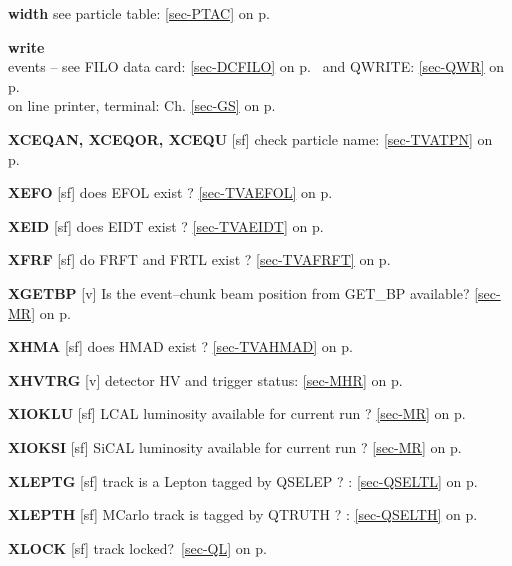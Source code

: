  
 \item{\bf width   }see particle table: \ref{sec-PTAC} on p.~\pageref{sec-PTAC}\\
 \item{\bf write}\\
 \subitem events -- see FILO data card: \ref{sec-DCFILO} on p.~\pageref{sec-DCFILO}
 and QWRITE:
 \ref{sec-QWR} on p.~\pageref{sec-QWR}\\
 \subitem on line printer, terminal: Ch. \ref{sec-GS} on p.~\pageref{sec-GS}
 
 
 \item{\bf XCEQAN, XCEQOR, XCEQU  }[sf] check particle name:
 \ref{sec-TVATPN} on p.~\pageref{sec-TVATPN}\\
 \item{\bf XEFO    }[sf] does EFOL exist ? \ref{sec-TVAEFOL} on p.~\pageref{sec-TVAEFOL}\\
 \item{\bf XEID    }[sf] does EIDT exist ? \ref{sec-TVAEIDT} on p.~\pageref{sec-TVAEIDT}\\
 \item{\bf XFRF    }[sf] do FRFT and FRTL exist ? \ref{sec-TVAFRFT} on p.~\pageref{sec-TVAFRFT}\\
 \item{\bf XGETBP  }[v] Is the event--chunk beam position from GET\_BP available?
 \ref{sec-MR} on p.~\pageref{sec-MR}\\
 \item{\bf XHMA    }[sf] does HMAD exist ? \ref{sec-TVAHMAD} on p.~\pageref{sec-TVAHMAD}\\
 \item{\bf XHVTRG  }[v]  detector HV and trigger status: \ref{sec-MHR} on p.~\pageref{sec-MHR}\\
 \item{\bf XIOKLU  }[sf] LCAL  luminosity available for current run ? \ref{sec-MR} on p.~\pageref{sec-MR}\\
 \item{\bf XIOKSI  }[sf] SiCAL luminosity available for current run ? \ref{sec-MR} on p.~\pageref{sec-MR}\\
 \item{\bf XLEPTG  }[sf] track is a Lepton tagged by QSELEP ? : \ref{sec-QSELTL} on p.~\pageref{sec-QSELTL}\\
 \item{\bf XLEPTH  }[sf] MCarlo track is tagged by QTRUTH ? : \ref{sec-QSELTH} on p.~\pageref{sec-QSELTH}\\
 \item{\bf XLOCK   }[sf] track locked?~\ref{sec-QL} on p.~\pageref{sec-QL}\\
